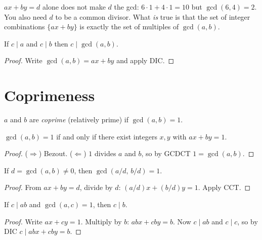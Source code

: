 \begin{important}
$ax + by = d$ alone does not make $d$ the gcd: $6\cdot 1 + 4 \cdot 1 = 10$ but
$\gcd(6,4) = 2$. You also need $d$ to be a common divisor. What \emph{is} true is that the
set of integer combinations $\{ax + by\}$ is exactly the set of multiples of $\gcd(a,b)$.
\end{important}

\begin{corollary}
If $c \mid a$ and $c \mid b$ then $c \mid \gcd(a,b)$.
\end{corollary}
\begin{proof}
Write $\gcd(a,b) = ax + by$ and apply DIC.
\end{proof}

\section{Coprimeness}

\begin{definition}
$a$ and $b$ are \emph{coprime} (relatively prime) if $\gcd(a,b) = 1$.
\end{definition}

\begin{theorem}
$\gcd(a,b) = 1$ if and only if there exist integers $x,y$ with $ax + by = 1$.
\end{theorem}
\begin{proof}
($\Rightarrow$) Bezout. ($\Leftarrow$) $1$ divides $a$ and $b$, so by GCDCT $1 = \gcd(a,b)$.
\end{proof}

\begin{proposition}
If $d = \gcd(a,b) \ne 0$, then $\gcd(a/d,\, b/d) = 1$.
\end{proposition}
\begin{proof}
From $ax + by = d$, divide by $d$: $(a/d)x + (b/d)y = 1$. Apply CCT.
\end{proof}

\begin{proposition}
If $c \mid ab$ and $\gcd(a,c) = 1$, then $c \mid b$.
\end{proposition}
\begin{proof}
Write $ax + cy = 1$. Multiply by $b$: $abx + cby = b$. Now $c \mid ab$ and $c \mid c$, so by
DIC $c \mid abx + cby = b$.
\end{proof}


